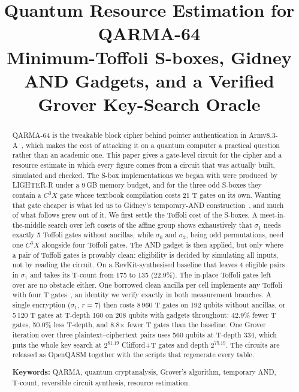 \documentclass[runningheads,10pt]{llncs}
\title{Quantum Resource Estimation for QARMA-64\\
\large Minimum-Toffoli S-boxes, Gidney AND Gadgets, and a Verified Grover Key-Search Oracle}
\author{}
\institute{}
\date{}
\begin{document}
\maketitle

\begin{abstract}
QARMA-64 is the tweakable block cipher behind pointer authentication in Armv8.3-A~\cite{avanzi2017qarma,qualcomm2017pac}, which makes the cost of attacking it on a quantum computer a practical question rather than an academic one. This paper gives a gate-level circuit for the cipher and a resource estimate in which every figure comes from a circuit that was actually built, simulated and checked. The S-box implementations we began with were produced by LIGHTER-R under a 9\,GB memory budget, and for the three odd S-boxes they contain a $C^3X$ gate whose textbook compilation costs 21 T gates on its own. Wanting that gate cheaper is what led us to Gidney's temporary-AND construction~\cite{gidney2018halving}, and much of what follows grew out of it. We first settle the Toffoli cost of the S-boxes. A meet-in-the-middle search over left cosets of the affine group shows exhaustively that $\sigma_1$ needs exactly 5 Toffoli gates without ancillas, while $\sigma_0$ and $\sigma_2$, being odd permutations, need one $C^3X$ alongside four Toffoli gates. The AND gadget is then applied, but only where a pair of Toffoli gates is provably clean: eligibility is decided by simulating all inputs, not by reading the circuit. On a RevKit-synthesised baseline that leaves 4 eligible pairs in $\sigma_1$ and takes its T-count from 175 to 135 (22.9\%). The in-place Toffoli gates left over are no obstacle either. One borrowed clean ancilla per cell implements any Toffoli with four T gates~\cite{jones2013lowoverhead,gidney2018halving}, an identity we verify exactly in both measurement branches. A single encryption ($\sigma_1$, $r=7$) then costs 8\,960 T gates on 192 qubits without ancillas, or 5\,120 T gates at T-depth 160 on 208 qubits with gadgets throughout: 42.9\% fewer T gates, 50.0\% less T-depth, and 8.8$\times$ fewer T gates than the baseline. One Grover iteration over three plaintext--ciphertext pairs uses 560 qubits at T-depth 334, which puts the whole key search at $2^{81.19}$ Clifford+T gates and depth $2^{75.19}$. The circuits are released as OpenQASM together with the scripts that regenerate every table.

\medskip
\noindent\textbf{Keywords:} QARMA, quantum cryptanalysis, Grover's algorithm, temporary AND, T-count, reversible circuit synthesis, resource estimation.
\end{abstract}
\end{document}
